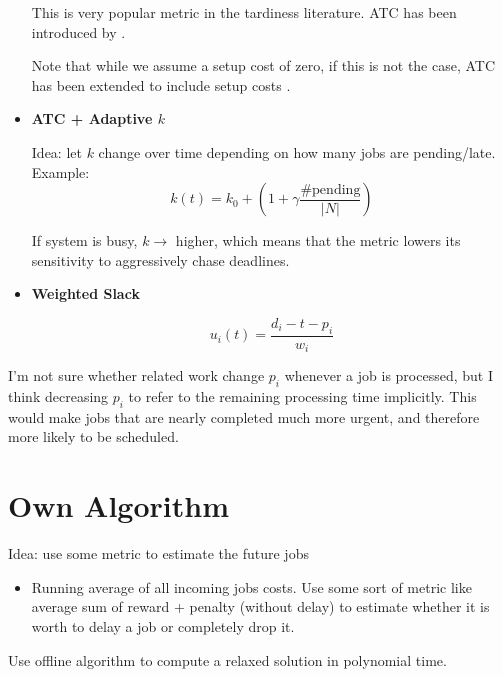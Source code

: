 \begin{itemize}
        This is very popular metric in the tardiness literature. ATC has been introduced by \citet{vepsalainen1987priority}. 

        Note that while we assume a setup cost of zero, if this is not the case, ATC has been extended to include setup costs \citep{lee1997heuristic}.

    \item \textbf{ATC + Adaptive $k$}
    
        Idea: let $k$ change over time depending on how many jobs are pending/late.\\
        Example:
        \begin{equation}
            k(t) = k_0 + \left ( 1+ \gamma \frac{\#\mathrm{pending}}{|N|} \right )
        \end{equation}

        If system is busy, $k \rightarrow$ higher, which means that the metric lowers its sensitivity to aggressively chase deadlines.
        
    \item \textbf{Weighted Slack} 
    
        \begin{equation}
            u_i (t) = \frac{d_i - t - p_i}{w_i}
        \end{equation}


\end{itemize}

I'm not sure whether related work change $p_i$ whenever a job is processed, but I think decreasing $p_i$ to refer to the remaining processing time implicitly. This would make jobs that are nearly completed much more urgent, and therefore more likely to be scheduled.


\section{Own Algorithm}

Idea: use some metric to estimate the future jobs
\begin{itemize}
    \item Running average of all incoming jobs costs. 
    Use some sort of metric like average sum of reward + penalty (without delay) to estimate whether it is worth to delay a job or completely drop it.
\end{itemize}

Use offline algorithm to compute a relaxed solution in polynomial time.

